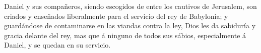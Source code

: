 \bchapter[capítulo]

\begin{chaptercomment}
 \footnotemarkchapter{}
Daniel y sus compañeros, siendo escogidos de entre los cautivos de Jerusalem, son
  criados y enseñados liberalmente para el servicio del rey de Babylonia; y guardándose
  de contaminarse en las viandas contra la ley, Dios les da sabiduría
  y gracia delante del rey, mas que á ninguno de todos sus sábios, especialmente
  á Daniel, y se quedan en su servicio.
\end{chaptercomment}

\vspace{\baselineskip}


